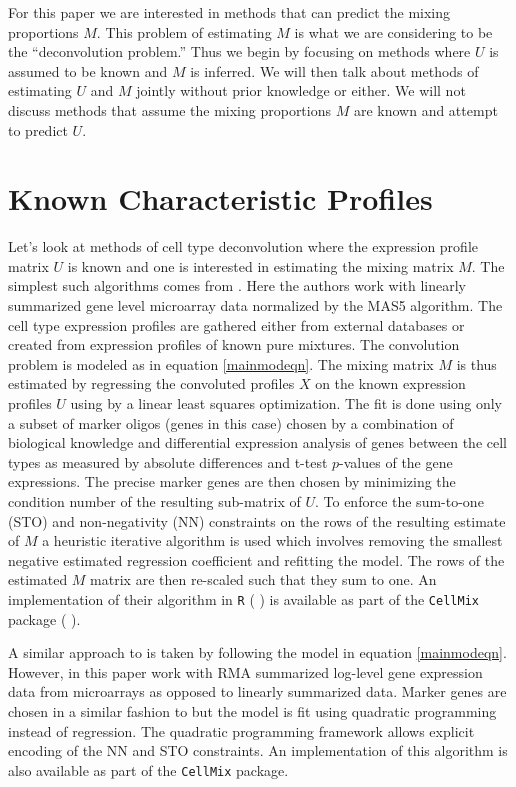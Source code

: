 \documentclass[reqno,12pt,oneside]{report}\usepackage[]{graphicx}\usepackage[]{color}
\renewcommand{\citet}[1]{(\citeauthor{#1} \citeyear{#1})}
\theoremstyle{plain}
\theoremstyle{definition}
\theoremstyle{remark}
\numberwithin{theorem}{chapter}     %
\begin{document}
For this paper we are interested in methods that can predict the mixing proportions $M$. This problem of estimating $M$ is what we are considering to be the ``deconvolution problem.'' Thus we begin by focusing on methods where $U$ is assumed to be known and $M$ is inferred. We will then talk about methods of estimating $U$ and $M$ jointly without prior knowledge or either. We will not discuss methods that assume the mixing proportions $M$ are known and attempt to predict $U$.  

\section{Known Characteristic Profiles}
\label{litrev:knownu}

Let's look at methods of cell type deconvolution where the expression profile matrix $U$ is known and one is interested in estimating the mixing matrix $M$. The simplest such algorithms comes from \cite{Abbas2009}. Here the authors work with linearly summarized gene level microarray data normalized by the  MAS5 algorithm. The cell type expression profiles are gathered either from external databases or created from expression profiles of known pure mixtures. The convolution problem is modeled as in equation \ref{mainmodeqn}. The mixing matrix $M$ is thus estimated by regressing the convoluted profiles $X$ on the known expression profiles $U$ using by a linear least squares optimization. The fit is done using only a subset of marker oligos (genes in this case) chosen by a combination of biological knowledge and differential expression analysis of genes between the cell types as measured by absolute differences and t-test $p$-values of the gene expressions. The precise marker genes are then chosen by minimizing the condition number of the resulting sub-matrix of $U$. To enforce the sum-to-one (STO) and non-negativity (NN) constraints on the rows of the resulting estimate of $M$ a heuristic iterative algorithm is used which involves removing the smallest negative estimated regression coefficient and refitting the model. The rows of the estimated $M$ matrix are then re-scaled such that they sum to one. An implementation of their algorithm in \verb+R+ \citet{R2016} is available as part of the \verb+CellMix+ package \citet{Gaujoux2013}.

A similar approach to \citeauthor{Abbas2009} is taken by \cite{Gong2011} following the model in equation \ref{mainmodeqn}. However, in this paper \citeauthor{Gong2011} work with RMA summarized log-level gene expression data from microarrays as opposed to linearly summarized data. Marker genes are chosen in a similar fashion to \citeauthor{Abbas2009} but the model is fit using quadratic programming instead of regression. The quadratic programming framework allows explicit encoding of the NN and STO constraints. An implementation of this algorithm is also available as part of the \verb+CellMix+ package.
\end{document}
